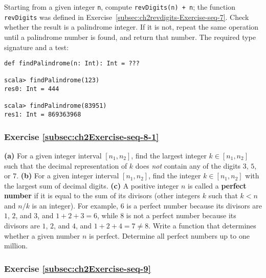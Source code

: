 Starting from a given integer \lstinline!n!,
compute \lstinline!revDigits(n) + n!;
the function \lstinline!revDigits!
was defined in Exercise~\ref{subsec:ch2revdigits-Exercise-seq-7}.
Check whether the result is a palindrome integer. If it is not, repeat
the same operation until a palindrome number is found, and return
that number. The required type signature and a test:
\begin{lstlisting}
def findPalindrome(n: Int): Int = ???

scala> findPalindrome(123)
res0: Int = 444

scala> findPalindrome(83951)
res1: Int = 869363968
\end{lstlisting}
\begin{comment}
Solution:\inputencoding{latin9}
\begin{lstlisting}
def findPalindrome(n: Int): Int = Stream.iterate(n){x => x + revDigits(x)}.filter(isPalindrome).take(1).toList.head
\end{lstlisting}
\inputencoding{utf8}\end{comment}


\subsubsection{Exercise \label{subsec:ch2Exercise-seq-8-1}\ref{subsec:ch2Exercise-seq-8-1}}

\textbf{(a)} For a given integer interval $\left[n_{1},n_{2}\right]$,
find the largest integer $k\in\left[n_{1},n_{2}\right]$ such that
the decimal representation of $k$ does \emph{not} contain any of
the digits $3$, $5$, or $7$. \textbf{(b)} For a given integer interval
$\left[n_{1},n_{2}\right]$, find the integer $k\in\left[n_{1},n_{2}\right]$
with the largest sum of decimal digits. \textbf{(c)} A positive integer
$n$ is called a \textbf{perfect number} if
it is equal to the sum of its divisors (other integers $k$ such that
$k<n$ and $n/k$ is an integer). For example, $6$ is a perfect number
because its divisors are $1$, $2$, and $3$, and $1+2+3=6$, while
$8$ is not a perfect number because its divisors are $1$, $2$,
and $4$, and $1+2+4=7\neq8$. Write a function that determines whether
a given number $n$ is perfect. Determine all perfect numbers up to
one million.

\subsubsection{Exercise \label{subsec:ch2Exercise-seq-9}\ref{subsec:ch2Exercise-seq-9}}

